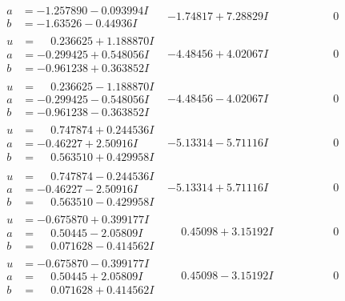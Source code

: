 \documentclass[1p]{elsarticle_modified}
\theoremstyle{definition}
\begin{document}
$$\begin{array}{c|c|c}
\begin{aligned}
a &= -1.257890 - 0.093994 I \\
b &= -1.63526 - 0.44936 I\end{aligned}
 & -1.74817 + 7.28829 I & \phantom{-0.000000 } 0 \\ \hline\begin{aligned}
u &= \phantom{-}0.236625 + 1.188870 I \\
a &= -0.299425 + 0.548056 I \\
b &= -0.961238 + 0.363852 I\end{aligned}
 & -4.48456 + 4.02067 I & \phantom{-0.000000 } 0 \\ \hline\begin{aligned}
u &= \phantom{-}0.236625 - 1.188870 I \\
a &= -0.299425 - 0.548056 I \\
b &= -0.961238 - 0.363852 I\end{aligned}
 & -4.48456 - 4.02067 I & \phantom{-0.000000 } 0 \\ \hline\begin{aligned}
u &= \phantom{-}0.747874 + 0.244536 I \\
a &= -0.46227 + 2.50916 I \\
b &= \phantom{-}0.563510 + 0.429958 I\end{aligned}
 & -5.13314 - 5.71116 I & \phantom{-0.000000 } 0 \\ \hline\begin{aligned}
u &= \phantom{-}0.747874 - 0.244536 I \\
a &= -0.46227 - 2.50916 I \\
b &= \phantom{-}0.563510 - 0.429958 I\end{aligned}
 & -5.13314 + 5.71116 I & \phantom{-0.000000 } 0 \\ \hline\begin{aligned}
u &= -0.675870 + 0.399177 I \\
a &= \phantom{-}0.50445 - 2.05809 I \\
b &= \phantom{-}0.071628 - 0.414562 I\end{aligned}
 & \phantom{-}0.45098 + 3.15192 I & \phantom{-0.000000 } 0 \\ \hline\begin{aligned}
u &= -0.675870 - 0.399177 I \\
a &= \phantom{-}0.50445 + 2.05809 I \\
b &= \phantom{-}0.071628 + 0.414562 I\end{aligned}
 & \phantom{-}0.45098 - 3.15192 I & \phantom{-0.000000 } 0 \\ \hline\begin{aligned}

\end{aligned}
\end{array}$$
\end{document}
